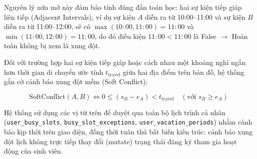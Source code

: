 Nguyên lý nửa mở này đảm bảo tính đúng đắn toán học: hai sự kiện tiếp giáp liên tiếp (Adjacent Intervals), ví dụ sự kiện $A$ diễn ra từ 10:00--11:00 và sự kiện $B$ diễn ra từ 11:00--12:00, sẽ có $\max(10:00, 11:00) = 11:00$ và $\min(11:00, 12:00) = 11:00$, do đó điều kiện $11:00 < 11:00$ là False $\rightarrow$ Hoàn toàn không bị xem là xung đột.

Đối với trường hợp hai sự kiện tiếp giáp hoặc cách nhau một khoảng nghỉ ngắn hơn thời gian di chuyển ước tính $t_{\text{travel}}$ giữa hai địa điểm trên bản đồ, hệ thống gắn cờ cảnh báo xung đột mềm (Soft Conflict):

\begin{equation}
\text{SoftConflict}(A, B) \iff 0 \le (s_B - e_A) < t_{\text{travel}} \quad (\text{với } s_B \ge e_A)
\end{equation}

Hệ thống sử dụng các vị từ trên để duyệt qua toàn bộ lịch trình cá nhân (\texttt{user\_busy\_slots}, \texttt{busy\_slot\_exceptions}, \texttt{user\_vacation\_periods}) nhằm cảnh báo kịp thời trên giao diện, đồng thời tuân thủ bất biến kiến trúc: cảnh báo xung đột lịch không trực tiếp thay đổi (mutate) trạng thái đăng ký tham gia hoạt động của sinh viên.

